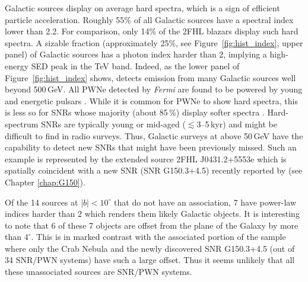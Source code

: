 {Galactic sources display on average hard spectra, which is a sign
of efficient particle acceleration. Roughly 55\% of all Galactic
sources have a spectral index lower than 2.2. For comparison, only 14\% of the { 2FHL} blazars
display such hard spectra. %
A sizable fraction (approximately 25\%, 
see Figure~\ref{fig:hist_index}, upper panel)
of Galactic sources has a photon
index harder than 2, implying a high-energy SED peak in the TeV band.
Indeed, as the lower panel of Figure~\ref{fig:hist_index} shows,
\lat{} detects emission from many Galactic sources well beyond 500\,GeV.
All PWNe detected by {\it Fermi} are found to be powered by young
and energetic pulsars \citep[age $\lesssim 30$\,kyr,][]{Acero13}.
While it is common for PWNe to show hard spectra, this is less
so for SNRs whose majority (about 85\,\%) display softer spectra
\citep{snrCat}. Hard-spectrum SNRs are typically young or 
mid-aged ($\lesssim$3--5\,kyr)
and might be difficult to find in radio surveys. Thus, Galactic surveys
at above 50\,GeV have the capability to detect new SNRs that
might have been previously missed.
Such an example is represented by the extended source 
2FHL J0431.2+5553e which is spatially coincident with a 
new SNR (SNR G150.3+4.5) recently reported by \cite{Gao14} (see Chapter \ref{chap:G150}).

Of the 14 sources at $|b|<10^{\circ}$ that do not have an
association, 7 have power-law indices harder than 2
which renders them  likely Galactic objects.
It is interesting to note that { 6 of these 7 objects} are offset from the plane of the Galaxy  by more than $4^{\circ}$. This is in marked contrast with the 
associated portion of the sample where only the Crab Nebula and the
newly discovered SNR G150.3+4.5 (out of 34 SNR/PWN systems) have such
a large offset. Thus it seems unlikely that all these unassociated sources
are SNR/PWN systems.

%
%

}
